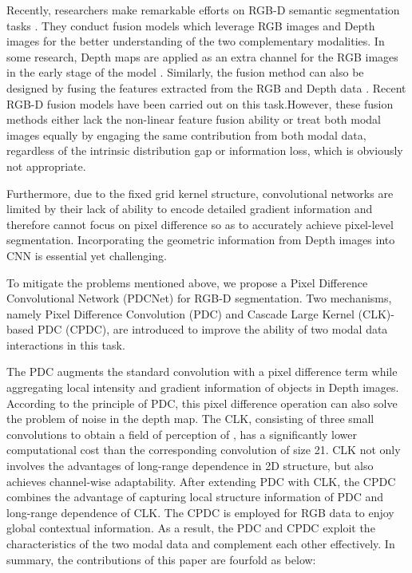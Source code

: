 \documentclass[lettersize,journal]{IEEEtran}
\begin{document}
Recently, researchers make remarkable efforts on RGB-D semantic segmentation tasks \cite{he2017std2p,jiang2018rednet}. They conduct fusion models which leverage RGB images and Depth images for the better understanding of the two complementary modalities. In some research, Depth maps are applied as an extra channel for the RGB images in the early stage of the model \cite{he2017std2p,husain2016combining}. Similarly, the fusion method can also be designed by fusing the features extracted from the RGB and Depth data \cite{jiang2018rednet, zhu2022vpfnet}. \iffalse Through such early fusion method, the combination of RGB image and Depth map can produce richer information in a united model. Not limited by the fusion stage, the features are learned more robustly through combining the features from the RGB image and Depth map of the intermediate layers \cite{cheng2017locality}. \fi \iffalse Recent RGB-D fusion models \cite{he2017std2p,husain2016combining,jiang2018rednet,cheng2017locality,lin2017cascaded,park2017rdfnet} have been carried out on this task.\fi However, these fusion methods either lack the non-linear feature fusion ability or treat both modal images equally by engaging the same contribution from both modal data, regardless of the intrinsic distribution gap or information loss, which is obviously not appropriate.

Furthermore, due to the fixed grid kernel structure, convolutional networks are limited by their lack of ability to encode detailed gradient information and therefore cannot focus on pixel difference so as to accurately achieve pixel-level segmentation. Incorporating the geometric information from Depth images into CNN is essential yet challenging. 

To mitigate the problems mentioned above, we propose a Pixel Difference Convolutional Network (PDCNet) for RGB-D segmentation. Two mechanisms, namely Pixel
Difference Convolution (PDC) and Cascade Large Kernel (CLK)-based PDC (CPDC), are introduced to improve the ability of two modal data interactions in this task.

The PDC augments the standard convolution with a pixel difference term while aggregating local intensity and gradient information of objects in Depth images. According to the principle of PDC, this pixel difference operation can also solve the problem of noise in the depth map.
The CLK, consisting of three small convolutions to obtain a field of perception of , has a significantly lower computational cost than the corresponding convolution of size 21.
CLK not only involves the advantages of long-range dependence in 2D structure, but also achieves channel-wise adaptability. After extending PDC with CLK, the CPDC combines the advantage of capturing local structure information of PDC and long-range dependence of CLK. The CPDC is employed for RGB data to enjoy global contextual information. As a result, the PDC and CPDC exploit the characteristics of 
the two modal data and complement each other effectively. In summary, the contributions of this paper are fourfold as below: 
\end{document}
